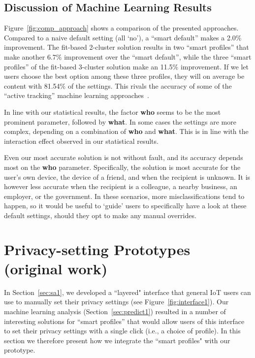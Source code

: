 \subsection{Discussion of Machine Learning Results}
Figure~\ref{fig:comp_approach} shows a comparison of the presented approaches. Compared to a naive default setting (all `no'), a ``smart default'' makes a 2.0\% improvement. The fit-based 2-cluster solution results in two ``smart profiles'' that make another 6.7\% improvement over the ``smart default'', while the three ``smart profiles'' of the fit-based 3-cluster solution make an 11.5\% improvement. If we let users choose the best option among these three profiles, they will on average be content with 81.54\% of the settings. This rivals the accuracy of some of the ``active tracking'' machine learning approaches~\cite{sadeh2009understanding}.

In line with our statistical results, the factor \textbf{who} seems to be the most prominent parameter, followed by \textbf{what}. In some cases the settings are more complex, depending on a combination of \textbf{who} and \textbf{what}. This is in line with the interaction effect observed in our statistical results.

Even our most accurate solution is not without fault, and its accuracy depends most on the \textbf{who} parameter. Specifically, the solution is most accurate for the user's own device, the device of a friend, and when the recipient is unknown. It is however less accurate when the recipient is a colleague, a nearby business, an employer, or the government. In these scenarios, more misclassifications tend to happen, so it would be useful to `guide' users to specifically have a look at these default settings, should they opt to make any manual overrides.

\section{Privacy-setting Prototypes (original work)}\label{sec:design1}
In Section~\ref{sec:sa1}, we developed a ``layered" interface that general IoT users can use to manually set their privacy settings (see Figure~\ref{fig:interface1}). Our machine learning analysis (Section~\ref{sec:predict1}) resulted in a number of interesting solutions for ``smart profiles'' that would allow users of this interface to set their privacy settings with a single click (i.e., a choice of profile). In this section we therefore present how we integrate the ``smart profiles" with our prototype. 

